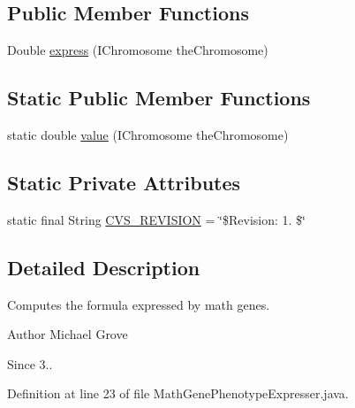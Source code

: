 \subsection*{Public Member Functions}
\begin{DoxyCompactItemize}
\item 
Double \hyperlink{classexamples_1_1math_1_1ga_1_1_math_gene_phenotype_expresser_a57e14d79266c4c9a374b61a29a895bd5}{express} (I\-Chromosome the\-Chromosome)
\end{DoxyCompactItemize}
\subsection*{Static Public Member Functions}
\begin{DoxyCompactItemize}
\item 
static double \hyperlink{classexamples_1_1math_1_1ga_1_1_math_gene_phenotype_expresser_a2567105758c5056689461d3e130e1a77}{value} (I\-Chromosome the\-Chromosome)
\end{DoxyCompactItemize}
\subsection*{Static Private Attributes}
\begin{DoxyCompactItemize}
\item 
static final String \hyperlink{classexamples_1_1math_1_1ga_1_1_math_gene_phenotype_expresser_a3e05416a4fb87df5d0643fccee79685f}{C\-V\-S\-\_\-\-R\-E\-V\-I\-S\-I\-O\-N} = \char`\"{}\$Revision\-: 1. \$\char`\"{}
\end{DoxyCompactItemize}


\subsection{Detailed Description}
Computes the formula expressed by math genes.

\begin{DoxyAuthor}{Author}
Michael Grove 
\end{DoxyAuthor}
\begin{DoxySince}{Since}
3.. 
\end{DoxySince}


Definition at line 23 of file Math\-Gene\-Phenotype\-Expresser.\-java.



